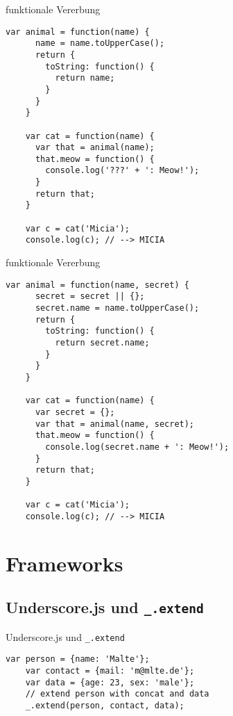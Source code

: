 \begin{frame}[fragile]{funktionale Vererbung}
  \begin{lstlisting}[gobble=4]
    var animal = function(name) {
      name = name.toUpperCase();
      return {
        toString: function() {
          return name;
        }
      }
    }
    
    var cat = function(name) {
      var that = animal(name);
      that.meow = function() {
        console.log('???' + ': Meow!');
      }
      return that;
    }
    
    var c = cat('Micia');
    console.log(c); // --> MICIA
  \end{lstlisting}
\end{frame}

\begin{frame}[fragile]{funktionale Vererbung}
  \begin{lstlisting}[gobble=4]
    var animal = function(name, secret) {
      secret = secret || {};
      secret.name = name.toUpperCase();
      return {
        toString: function() {
          return secret.name;
        }
      }
    }
    
    var cat = function(name) {
      var secret = {};
      var that = animal(name, secret);
      that.meow = function() {
        console.log(secret.name + ': Meow!');
      }
      return that;
    }
    
    var c = cat('Micia');
    console.log(c); // --> MICIA
  \end{lstlisting}
\end{frame}

\section{Frameworks}

\subsection{Underscore.js und \texttt{\_.extend}}

\begin{frame}[fragile]{Underscore.js und \texttt{\_.extend}}
  \begin{lstlisting}[basicstyle=\ttfamily,gobble=4]
    var person = {name: 'Malte'};
    var contact = {mail: 'm@mlte.de'};
    var data = {age: 23, sex: 'male'};
    // extend person with concat and data
    _.extend(person, contact, data);
  \end{lstlisting}
\end{frame}

